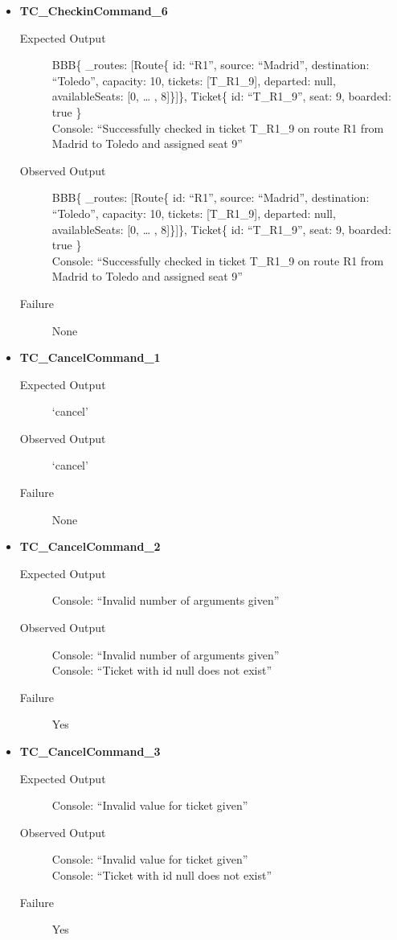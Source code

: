 \documentclass[11pt]{article}
\begin{document}
\begin{itemize}
\item \textbf{TC\_CheckinCommand\_6}
\begin{description}
\item[{Expected Output}] BBB\{ \_routes: [Route\{ id: “R1”, source: “Madrid”, destination: “Toledo”, capacity: 10,  tickets: [T\_R1\_9], departed: null, availableSeats: [0, … , 8]\}]\}, Ticket\{ id: “T\_R1\_9”, seat: 9, boarded: true \}\\
Console: “Successfully checked in ticket T\_R1\_9 on route R1 from Madrid to Toledo and assigned seat 9”
\item[{Observed Output}] BBB\{ \_routes: [Route\{ id: “R1”, source: “Madrid”, destination: “Toledo”, capacity: 10,  tickets: [T\_R1\_9], departed: null, availableSeats: [0, … , 8]\}]\}, Ticket\{ id: “T\_R1\_9”, seat: 9, boarded: true \}\\
Console: “Successfully checked in ticket T\_R1\_9 on route R1 from Madrid to Toledo and assigned seat 9”
\item[{Failure}] None
\end{description}

\item \textbf{TC\_CancelCommand\_1}
\begin{description}
\item[{Expected Output}] ‘cancel’
\item[{Observed Output}] ‘cancel’
\item[{Failure}] None
\end{description}

\item \textbf{TC\_CancelCommand\_2}
\begin{description}
\item[{Expected Output}] Console: “Invalid number of arguments given”
\item[{Observed Output}] Console: “Invalid number of arguments given”\\
Console: “Ticket with id null does not exist”
\item[{Failure}] Yes
\end{description}

\item \textbf{TC\_CancelCommand\_3}
\begin{description}
\item[{Expected Output}] Console: “Invalid value for ticket given”
\item[{Observed Output}] Console: “Invalid value for ticket given”\\
Console: “Ticket with id null does not exist”
\item[{Failure}] Yes
\end{description}


\end{itemize}
\end{document}
